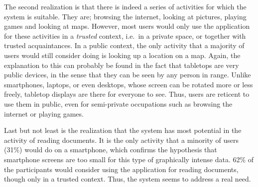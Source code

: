 The second realization is that there is indeed a series of activities for which the system is suitable.
They are; browsing the internet, looking at pictures, playing games and looking at maps.
However, most users would only use the application for these activities in a \emph{trusted} context, i.e.\ in a private space, or together with trusted acquaintances.
In a public context, the only activity that a majority of users would still consider doing is looking up a location on a map.
Again, the explanation to this can probably be found in the fact that tabletops are very public devices, in the sense that they can be seen by any person in range.
Unlike smartphones, laptops, or even desktops, whose screen can be rotated more or less freely, tabletop displays are there for everyone to see.
Thus, users are reticent to use them in public, even for semi-private occupations such as browsing the internet or playing games.

Last but not least is the realization that the system has most potential in the activity of reading documents.
It is the only activity that a minority of users (31\%) would do on a smartphone, which confirms the hypothesis that smartphone screens are too small for this type of graphically intense data.
62\% of the participants would consider using the application for reading documents, though only in a trusted context.
Thus, the system seems to address a real need.


















